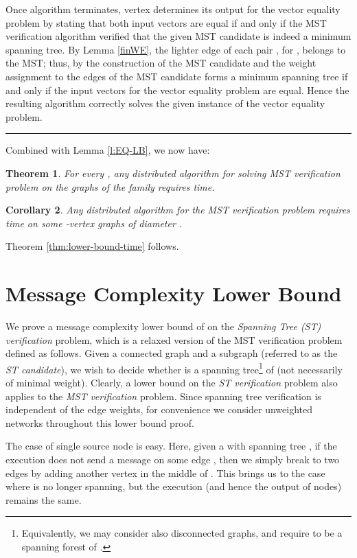 \documentclass[11pt,letter]{article}
\newtheorem{theorem}{Theorem}[section]
\newtheorem{corollary}[theorem]{Corollary}
\newcommand{\qed}{\rule{7pt}{7pt}}
\newenvironment{proof}{\noindent{\bf Proof}\hspace*{1em}}{\qed\bigskip}
\begin{document}
\begin{proof}
Once algorithm  terminates,  vertex  
determines its output for the vector equality problem by stating that both input vectors are equal if and only if the MST verification algorithm verified that the given MST candidate is indeed a minimum spanning tree.
By Lemma \ref{finWE}, the lighter edge of each pair , for
, belongs to the MST; 
thus, by the construction of the MST candidate and the weight assignment 
to the edges of  the MST candidate forms a minimum spanning tree 
if and only if  the input vectors  for the vector equality problem are equal.
Hence the resulting algorithm  correctly solves the given instance
of the vector equality  problem.
\end{proof}

Combined with Lemma \ref{l:EQ-LB}, we now have:
\begin{theorem}
For every , any distributed algorithm for solving  MST verification 
problem on the graphs of the family  
requires  time.
\end{theorem}

\begin{corollary}
\label{cl:sqrtn2}
Any distributed algorithm for the MST verification problem 
requires  time on
some -vertex graphs of diameter .
\end{corollary} 

Theorem \ref{thm:lower-bound-time} follows.

\section{Message Complexity Lower Bound}
\label{sec:msg-lb}

We prove a message complexity lower bound of  on the 
{\em Spanning Tree (ST) verification} problem, which is a relaxed version 
of the MST verification problem defined as follows. 
Given a connected graph  and a subgraph  
(referred to as the {\em ST candidate}), we wish to decide whether  
is a spanning tree\footnote{Equivalently, we may consider also disconnected 
graphs, and require  to be a spanning forest of .}
of  (not necessarily of minimal weight). 
Clearly, a lower bound on the {\em ST verification} problem also applies 
to the {\em MST verification} problem. Since spanning tree verification 
is independent of the edge weights, for convenience 
we consider unweighted networks throughout this lower bound proof.

The case of single source node is easy. Here, given a  with spanning tree 
, if the execution does not send a message on some edge 
, then we simply break  to two edges by adding 
another vertex in the middle of . This brings us to the case where  
is no longer spanning, but the execution (and hence the output of nodes) 
remains the same.
\end{document}
